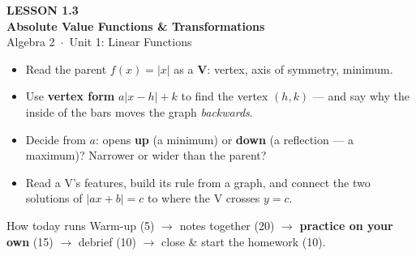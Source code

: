 \documentclass[aspectratio=169, 11pt]{beamer}
\begin{document}
{
\begin{frame}[plain]
  \vspace{2.8cm}\hspace{0.55cm}%
  \begin{minipage}{0.9\textwidth}
    {\color{goldacc}\bfseries\small LESSON 1.3}\\[0.5cm]
    {\color{white}\bfseries\LARGE Absolute Value Functions \& Transformations}\\[1.2cm]
    {\color{forestmid}\small Algebra 2~$\cdot$~Unit 1: Linear Functions}
  \end{minipage}
\end{frame}
}

\begin{frame}[t, plain]
  \begin{itemize}\setlength{\itemsep}{6pt}
    \item Read the parent $f(x)=|x|$ as a \textbf{V}: vertex, axis of symmetry, minimum.
    \item Use \textbf{vertex form} $a|x-h|+k$ to find the vertex $(h,k)$ --- and say why the
          inside of the bars moves the graph \emph{backwards}.
    \item Decide from $a$: opens \textbf{up} (a minimum) or \textbf{down} (a reflection --- a
          maximum)? Narrower or wider than the parent?
    \item Read a V's features, build its rule from a graph, and connect the two solutions of
          $|ax+b|=c$ to where the V crosses $y=c$.
  \end{itemize}
  \vspace{4pt}
  \begin{block}{How today runs}
    Warm-up (5) $\to$ notes together (20) $\to$ \textbf{practice on your own} (15) $\to$ debrief
    (10) $\to$ close \& start the homework (10).
  \end{block}
\end{frame}
\end{document}
